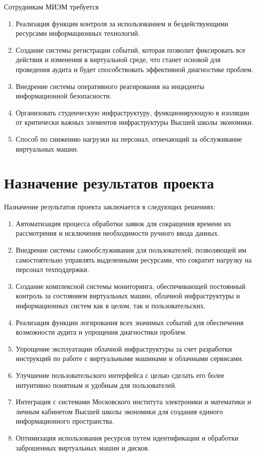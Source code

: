 \documentclass[14pt, a4paper]{extarticle}
\begin{document}
Сотрудникам МИЭМ требуется

\begin{enumerate}
\item Реализация функции контроля за использованием и бездействующими ресурсами информационных технологий.
\item Создание системы регистрации событий, которая позволит фиксировать все действия и изменения в виртуальной среде, что станет основой для проведения аудита и будет способствовать эффективной диагностике проблем.
\item Внедрение системы оперативного реагирования на инциденты информационной безопасности.
\item Организовать студенческую инфраструктуру, функционирующую в изоляции от критически важных элементов инфраструктуры Высшей школы экономики.
\item Способ по снижению нагрузки на персонал, отвечающий за обслуживание виртуальных машин.
\end{enumerate}

\section{Назначение результатов проекта}

Назначение результатов проекта заключается в следующих решениях:

\begin{enumerate}
\item Автоматизация процесса обработки заявок для сокращения времени их рассмотрения и исключения необходимости ручного ввода данных.
\item Внедрение системы самообслуживания для пользователей, позволяющей им самостоятельно управлять выделенными ресурсами, что сократит нагрузку на персонал техподдержки.
\item Создание комплексной системы мониторинга, обеспечивающей постоянный контроль за состоянием виртуальных машин, облачной инфраструктуры и информационных систем как в целом, так и пользовательских.
\item Реализация функции логирования всех значимых событий для обеспечения возможности аудита и упрощения диагностики проблем.
\item Упрощение эксплуатации облачной инфраструктуры за счет разработки инструкций по работе с виртуальными машинами и облачными сервисами.
\item Улучшение пользовательского интерфейса с целью сделать его более интуитивно понятным и удобным для пользователей.
\item Интеграция с системами Московского института электроники и математики и личным кабинетом Высшей школы экономики для создания единого информационного пространства.
\item Оптимизация использования ресурсов путем идентификации и обработки заброшенных виртуальных машин и дисков.
\end{enumerate}
\end{document}
